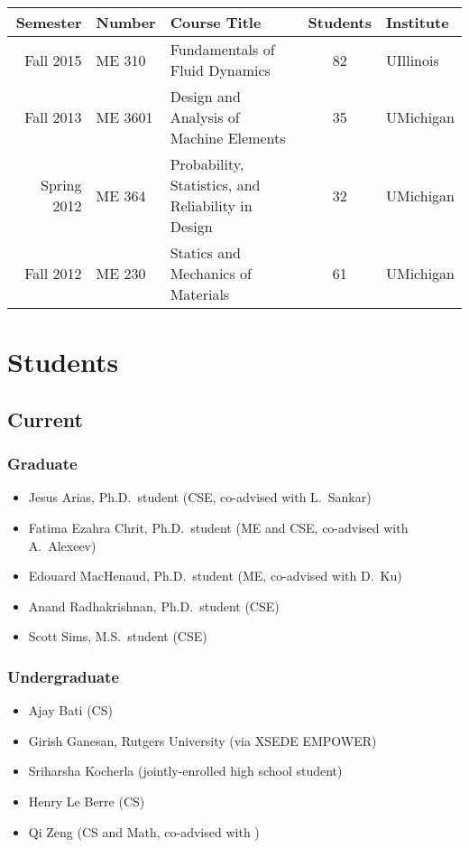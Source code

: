 \begin{center}
    \begin{tabular}{ r l l c l }
        \hline\hline
        \bf Semester  &\bf Number & \bf Course Title & \bf Students & \bf Institute \\
        \hline
        Fall   2015 & ME 310  & Fundamentals of Fluid Dynamics & 82 & UIllinois \\
        Fall   2013 & ME 3601 & Design and Analysis of Machine Elements & 35 & UMichigan\\
        Spring 2012 & ME 364  & Probability, Statistics, and Reliability in Design & 32 & UMichigan \\
        Fall   2012 & ME 230  & Statics and Mechanics of Materials & 61 & UMichigan \\
        \hline\hline
    \end{tabular}
\end{center}


\section{Students}

\subsection{Current}

\subsubsection{Graduate}

\begin{itemize}
    \item Jesus Arias, Ph.D.\ student (CSE, co-advised with L.\ Sankar)
    \item Fatima Ezahra Chrit, Ph.D.\ student (ME and CSE, co-advised with A.\ Alexeev)
    \item Edouard MacHenaud, Ph.D.\ student (ME, co-advised with D.\ Ku)
    \item Anand Radhakrishnan, Ph.D.\ student (CSE)
    \item Scott Sims, M.S.\ student (CSE)
\end{itemize}

\subsubsection{Undergraduate}

\begin{itemize}
    \item Ajay Bati (CS)
    \item Girish Ganesan, Rutgers University (via XSEDE EMPOWER)
    \item Sriharsha Kocherla (jointly-enrolled high school student)
    \item Henry Le Berre (CS)
    \item Qi Zeng (CS and Math, co-advised with \Florian)
\end{itemize}

